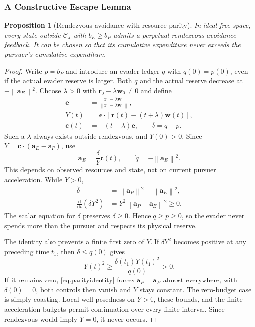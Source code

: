 \documentclass[journal,a4paper]{IEEEtran}
\newtheorem{proposition}{Proposition}
\newcommand{\C}{\mathcal C}
\newcommand{\norm}[1]{\left\|#1\right\|}
\newcommand{\dd}{\mathrm d}
\begin{document}
\subsubsection{A Constructive Escape Lemma}
\begin{proposition}[Rendezvous avoidance with resource parity]
\label{prop:parity}
In ideal free space, every state outside $\C_J$ with $b_E\ge b_P$ admits a perpetual rendezvous-avoidance feedback. It can be chosen so that its cumulative expenditure never exceeds the pursuer's cumulative expenditure.
\end{proposition}
\begin{proof}
Write $p=b_P$ and introduce an evader ledger $q$ with $q(0)=p(0)$, even if the actual evader reserve is larger. Both $q$ and the actual reserve decrease at $-\norm{\mathbf a_E}^2$. Choose $\lambda>0$ with $\mathbf r_0-\lambda\mathbf w_0\ne0$ and define
\begin{align}
 \mathbf e&=\frac{\mathbf r_0-\lambda\mathbf w_0}
                  {\norm{\mathbf r_0-\lambda\mathbf w_0}},\nonumber\\
 Y(t)&=\mathbf e\cdot[\mathbf r(t)-(t+\lambda)\mathbf w(t)],\label{eq:parityY}\\
 \mathbf c(t)&=-(t+\lambda)\mathbf e,\qquad \delta=q-p.\nonumber
\end{align}
Such a $\lambda$ always exists outside rendezvous, and $Y(0)>0$. Since $\dot Y=\mathbf c\cdot(\mathbf a_E-\mathbf a_P)$, use
\begin{equation}
 \boxed{\mathbf a_E=\frac{\delta}{Y}\mathbf c(t),\qquad
 \dot q=-\norm{\mathbf a_E}^2.}
 \label{eq:parityfeedback}
\end{equation}
This depends on observed resources and state, not on current pursuer acceleration. While $Y>0$,
\begin{align}
 \dot\delta&=\norm{\mathbf a_P}^2-\norm{\mathbf a_E}^2,\nonumber\\
 \frac{\dd}{\dd t}(\delta Y^2)
    &=Y^2\norm{\mathbf a_P-\mathbf a_E}^2\ge0.
 \label{eq:parityidentity}
\end{align}
The scalar equation for $\delta$ preserves $\delta\ge0$. Hence $q\ge p\ge0$, so the evader never spends more than the pursuer and respects its physical reserve.

The identity also prevents a finite first zero of $Y$. If $\delta Y^2$ becomes positive at any preceding time $t_1$, then $\delta\le q(0)$ gives
\begin{equation}
 Y(t)^2\ge\frac{\delta(t_1)Y(t_1)^2}{q(0)}>0.
\end{equation}
If it remains zero, \eqref{eq:parityidentity} forces $\mathbf a_P=\mathbf a_E$ almost everywhere; with $\delta(0)=0$, both controls then vanish and $Y$ stays constant. The zero-budget case is simply coasting. Local well-posedness on $Y>0$, these bounds, and the finite acceleration budgets permit continuation over every finite interval. Since rendezvous would imply $Y=0$, it never occurs.
\end{proof}
\end{document}
